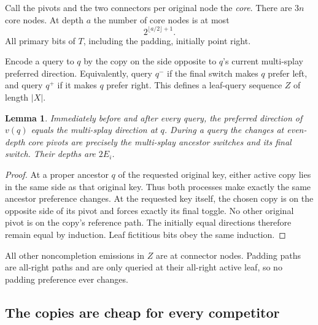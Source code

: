 \documentclass[11pt]{article}
\numberwithin{equation}{section}
\newtheorem{lemma}[theorem]{Lemma}
\begin{document}
Call the pivots and the two connectors per original node the
\emph{core}. There are $3n$ core nodes. At depth $a$ the number of core
nodes is at most
\begin{equation}\label{end:eq:core-level}
 2^{\lfloor a/2\rfloor+1}.
\end{equation}
All primary bits of $T$, including the padding, initially point right.

Encode a query to $q$ by the copy on the side opposite to $q$'s current
multi-splay preferred direction. Equivalently, query $q^-$ if the final
switch makes $q$ prefer left, and query $q^+$ if it makes $q$ prefer
right. This defines a leaf-query sequence $Z$ of length $|X|$.

\begin{lemma}\label{end:lem:core}
Immediately before and after every query, the preferred direction of
$v(q)$ equals the multi-splay direction at $q$. During a query the
changes at even-depth core pivots are precisely the multi-splay ancestor
switches and its final switch. Their depths are $2E_i$.
\end{lemma}
\begin{proof}
At a proper ancestor $q$ of the requested original key, either active
copy lies in the same side as that original key. Thus both processes
make exactly the same ancestor preference changes. At the requested
key itself, the chosen copy is on the opposite side of its pivot and
forces exactly its final toggle. No other original pivot is on the
copy's reference path. The initially equal directions therefore remain
equal by induction. Leaf fictitious bits obey the same induction.
\end{proof}

All other noncompletion emissions in $Z$ are at connector nodes.
Padding paths are all-right paths and are only queried at their
all-right active leaf, so no padding preference ever changes.

\subsection{The copies are cheap for every competitor}
\end{document}
